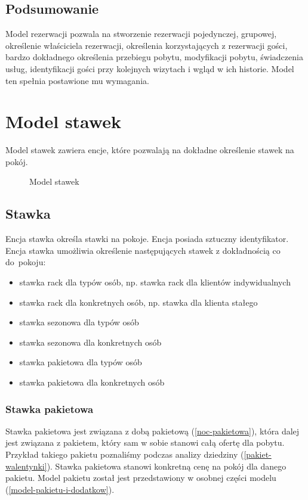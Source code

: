 \documentclass[a4paper,onecolumn,oneside,11pt,wide,floatssmall]{mwrep}
\theoremstyle{definition}
\theoremstyle{plain}%
\theoremstyle{remark}
\begin{document}
\subsection{Podsumowanie}
Model rezerwacji pozwala na stworzenie rezerwacji pojedynczej, grupowej, określenie właściciela rezerwacji, określenia korzystających z rezerwacji gości, bardzo dokładnego określenia przebiegu pobytu, modyfikacji pobytu, świadczenia usług, identyfikacji gości przy kolejnych wizytach i wgląd w ich historie. Model ten spełnia postawione mu wymagania.


\section{Model stawek}
Model stawek zawiera encje, które pozwalają na dokładne określenie stawek na pokój. 


\begin{figure}[H]
  \begin{center}
  \end{center}
  \caption{Model stawek}
  \label{fig:db-logical-model-rates}
\end{figure}

\subsection{Stawka}
Encja stawka określa stawki na pokoje. Encja posiada sztuczny identyfikator. Encja stawka umożliwia określenie następujących stawek z dokładnością co \mbox{do pokoju}:

\begin{itemize}
  \item stawka rack dla typów osób, np. stawka rack dla klientów indywidualnych
  \item stawka rack dla konkretnych osób, np. stawka dla klienta stałego
  \item stawka sezonowa dla typów osób
  \item stawka sezonowa dla konkretnych osób
  \item stawka pakietowa dla typów osób
  \item stawka pakietowa dla konkretnych osób
\end{itemize}

\subsubsection{Stawka pakietowa}
Stawka pakietowa jest związana z dobą pakietową (\ref{noc-pakietowa}), która dalej jest związana z pakietem, który sam w sobie stanowi całą ofertę dla pobytu. Przykład takiego pakietu poznaliśmy podczas analizy dziedziny (\ref{pakiet-walentynki}). Stawka pakietowa stanowi konkretną cenę na pokój dla danego pakietu. Model pakietu został jest przedstawiony w osobnej części modelu (\ref{model-pakietu-i-dodatkow}).
\end{document}

